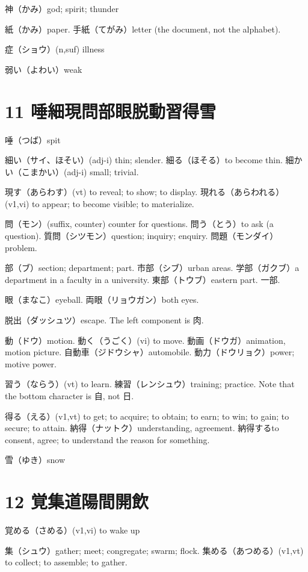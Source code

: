 神（かみ）god; spirit; thunder

紙（かみ）paper.
手紙（てがみ）letter (the document, not the alphabet).

症（ショウ）(n,suf) illness

弱い（よわい）weak

\section{11 唾細現問部眼脱動習得雪}

唾（つば）spit

細い（サイ、ほそい）(adj-i) thin; slender.
細る（ほそる）to become thin.
細かい（こまかい）(adj-i) small; trivial.

現す（あらわす）(vt) to reveal; to show; to display.
現れる（あらわれる）(v1,vi) to appear; to become visible; to materialize.

問（モン）(suffix, counter) counter for questions.
問う（とう）to ask (a question).
質問（シツモン）question; inquiry; enquiry.
問題（モンダイ）problem.

部（ブ）section; department; part.
市部（シブ）urban areas.
学部（ガクブ）a department in a faculty in a university.
東部（トウブ）eastern part.
一部.

眼（まなこ）eyeball.
両眼（リョウガン）both eyes.

脱出（ダッシュツ）escape.
The left component is 肉.

動（ドウ）motion.
動く（うごく）(vi) to move.
動画（ドウガ）animation, motion picture.
自動車（ジドウシャ）automobile.
動力（ドウリョク）power; motive power.

習う（ならう）(vt) to learn.
練習（レンシュウ）training; practice.
Note that the bottom character is 自, not 日.

得る（える）(v1,vt) to get; to acquire; to obtain; to earn; to win; to gain; to secure; to attain.
納得（ナットク）understanding, agreement.
納得するto consent, agree; to understand the reason for something.

雪（ゆき）snow

\section{12 覚集道陽間開飲}

覚める（さめる）(v1,vi) to wake up

集（シュウ）gather; meet; congregate; swarm; flock.
集める（あつめる）(v1,vt) to collect; to assemble; to gather.

